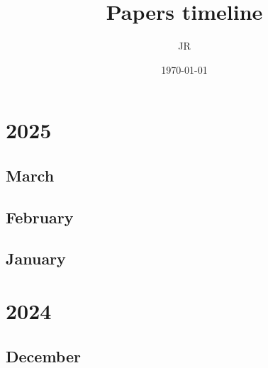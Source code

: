 \documentclass[12pt]{article}
\begin{document}
\title{\Large Papers timeline}
\author{JR}
\date{\today}

\maketitle

\tableofcontents

\newpage
\section{2025}

\subsection{March}

\subsection{February}
\begin{refsection}
    \nocite{}
    \printbibliography[heading=none]
\end{refsection}


\subsection{January}
\begin{refsection}
    \nocite{deepseek-ai_deepseek-r1_2025}
    \printbibliography[heading=none]
\end{refsection}


\newpage
\section{2024}
\subsection{December}
\begin{refsection}
    \nocite{qwen_qwen25_2025}
    \printbibliography[heading=none]
\end{refsection}
\end{document}
